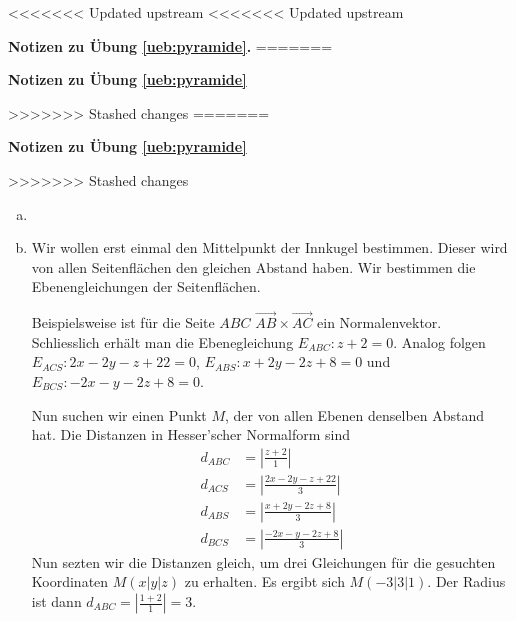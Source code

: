 \documentclass[%
11pt,%
twoside,%
titlepage,%
<<<<<<< Updated upstream
<<<<<<< Updated upstream
german,%
=======
swissgerman,%
>>>>>>> Stashed changes
=======
swissgerman,%
>>>>>>> Stashed changes
headsepline%
]{scrartcl}
\newcommand{\faReturnGray}{\textcolor{gray}{\faMailReply}} %
\newcommand{\faReturnGray}{\textcolor{gray}{\faMailReply}} %
\theoremstyle{definition}
\theoremstyle{plain}
\newcommand{\concatueb}[1]{ueb:#1}%
\newcommand{\concatlsg}[1]{lsg:#1}%
\newenvironment{lsg}[1]{%
<<<<<<< Updated upstream
<<<<<<< Updated upstream
    \par\noindent\textbf{Notizen zu Übung \ref{\concatueb{#1}}.}%
    \label{\concatlsg{#1}}
=======
    \par\noindent\textbf{Notizen zu Übung \ref{\concatueb{#1}}}\label{\concatlsg{#1}}
    \hfill\hyperref[\concatueb{#1}]{\faReturnGray}\par %
>>>>>>> Stashed changes
=======
    \par\noindent\textbf{Notizen zu Übung \ref{\concatueb{#1}}}\label{\concatlsg{#1}}
    \hfill\hyperref[\concatueb{#1}]{\faReturnGray}\par %
>>>>>>> Stashed changes
}{%
    \par%
}
\begin{document}
\begin{lsg}{pyramide}

\begin{enumerate}[a)]
    \item 

\begin{center}
\end{center}

\item Wir wollen erst einmal den Mittelpunkt der Innkugel bestimmen. Dieser wird von allen Seitenflächen den gleichen Abstand haben. Wir bestimmen die Ebenengleichungen der Seitenflächen.

Beispielsweise ist für die Seite $ABC$ $\vec{AB}\times\vec{AC}$ ein Normalenvektor. Schliesslich erhält man die Ebenegleichung $E_{ABC}:z+2=0$. Analog folgen $E_{ACS}:2x-2y-z+22=0$, $E_{ABS}:x+2y-2z+8=0$ und $E_{BCS}:-2x-y-2z+8=0$.

Nun suchen wir einen Punkt $M$, der von allen Ebenen denselben Abstand hat. Die Distanzen in  Hesser'scher Normalform sind
\begin{align}
    d_{ABC} &= \left|\frac{z+2}{1}\right|\\
    d_{ACS} &= \left|\frac{2x-2y-z+22}{3}\right|\\
    d_{ABS} &= \left|\frac{x+2y-2z+8}{3}\right|\\
    d_{BCS} &= \left|\frac{-2x-y-2z+8}{3}\right|
\end{align}
Nun sezten wir die Distanzen gleich, um drei Gleichungen für die gesuchten Koordinaten $M(x|y|z)$ zu erhalten. Es ergibt sich $M(-3|3|1)$. Der Radius ist dann $d_{ABC} = \left|\frac{1+2}{1}\right|=3$.
\end{enumerate}
\end{lsg}
\end{document}
